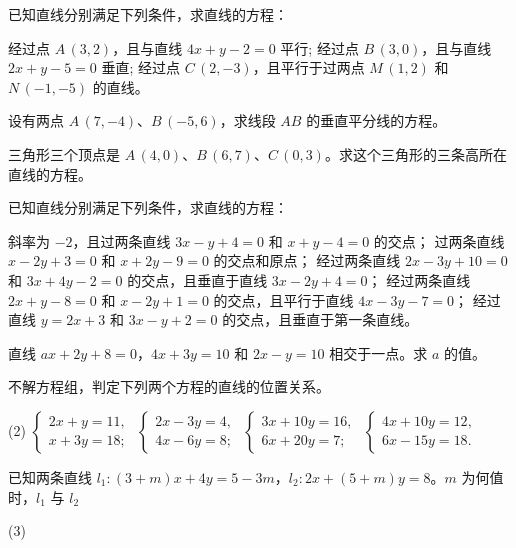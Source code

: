 \begin{Exercise}
  \begin{question}
    \item 已知直线分别满足下列条件，求直线的方程：
    \begin{tasks}
      \task 经过点 $A\,(3,2)$，且与直线 $4x+y-2=0$ 平行;
      \task 经过点 $B\,(3,0)$，且与直线 $2x+y-5=0$ 垂直;
      \task 经过点 $C\,(2,-3)$，且平行于过两点 $M\,(1,2)$ 和 $N\,(-1,-5)$ 的直线。
    \end{tasks}
    \item 设有两点 $A\,(7,-4)$、$B\,(-5,6)$，求线段 $AB$ 的垂直平分线的方程。
    \item 三角形三个顶点是 $A\,(4,0)$、$B\,(6,7)$、$C\,(0,3)$。求这个三角形的三条高所在直线的方程。
    \item 已知直线分别满足下列条件，求直线的方程：
    \begin{tasks}
      \task 斜率为 $-2$，且过两条直线 $3x-y+4=0$ 和 $x+y-4=0$ 的交点；
      \task 过两条直线 $x-2y+3=0$ 和 $x+2y-9=0$ 的交点和原点；
      \task 经过两条直线 $2x-3y+10=0$ 和 $3x+4y-2=0$ 的交点，且垂直于直线 $3x-2y+4=0$；
      \task 经过两条直线 $2x+y-8=0$ 和 $x-2y+1=0$ 的交点，且平行于直线 $4x-3y-7=0$；
      \task 经过直线 $y=2x+3$ 和 $3x-y+2=0$ 的交点，且垂直于第一条直线。
    \end{tasks}
    \item 直线 $ax+2y+8=0$，$4x+3y=10$ 和 $2x-y=10$ 相交于一点。求 $a$ 的值。
    \item 不解方程组，判定下列两个方程的直线的位置关系。
    \begin{tasks}(2)
      \task $\begin{cases} 2x+y=11,\\x+3y=18; \end{cases}$
      \task $\begin{cases} 2x-3y=4,\\4x-6y=8; \end{cases}$
      \task $\begin{cases} 3x+10y=16,\\6x+20y=7; \end{cases}$
      \task $\begin{cases} 4x+10y=12,\\6x-15y=18. \end{cases}$
    \end{tasks}
    \item 已知两条直线 $l_1:(3+m)x+4y=5-3m$，$l_2:2x+(5+m)y=8$。$m$ 为何值时，$l_1$ 与 $l_2$
    \begin{tasks}(3)

\end{tasks}
\end{question}
\end{Exercise}
